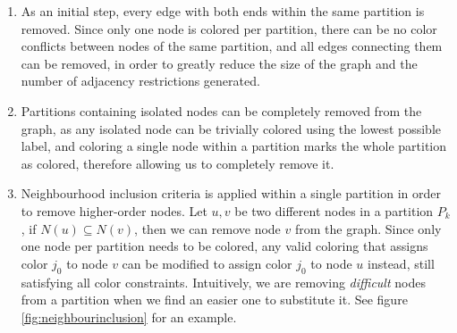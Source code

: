 \begin{enumerate}
	\item{As an initial step, every edge with both ends within the same partition is removed. Since only one node is colored per partition, there can be no color conflicts between nodes of the same partition, and all edges connecting them can be removed, in order to greatly reduce the size of the graph and the number of adjacency restrictions generated.}
	\item{Partitions containing isolated nodes can be completely removed from the graph, as any isolated node can be trivially colored using the lowest possible label, and coloring a single node within a partition marks the whole partition as colored, therefore allowing us to completely remove it.}
	\item{Neighbourhood inclusion criteria is applied within a single partition in order to remove higher-order nodes. Let $u,v$ be two different nodes in a partition $P_k$, if $N(u) \subseteq N(v)$, then we can remove node $v$ from the graph. Since only one node per partition needs to be colored, any valid coloring that assigns color $j_0$ to node $v$ can be modified to assign color $j_0$ to node $u$ instead, still satisfying all color constraints. Intuitively, we are removing \textit{difficult} nodes from a partition when we find an easier one to substitute it. See figure \ref{fig:neighbourinclusion} for an example.}
	
\begin{figure}
	\centering
\end{figure}
\end{enumerate}
